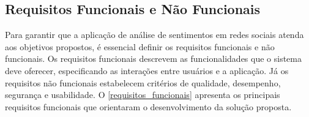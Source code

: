 \documentclass[
	12pt,				%
	oneside,			%
	a4paper,			%
	english,			%
	french,				%
	spanish,			%
	brazil				%
	]{abntex2}
\begin{document}
\hypertarget{requisitos-funcionais-e-nuxe3o-funcionais}{%
\subsection{Requisitos Funcionais e Não
Funcionais}\label{requisitos-funcionais-e-nuxe3o-funcionais}}

Para garantir que a aplicação de análise de sentimentos em redes sociais
atenda aos objetivos propostos, é essencial definir os requisitos
funcionais e não funcionais. Os requisitos funcionais descrevem as
funcionalidades que o sistema deve oferecer, especificando as interações
entre usuários e a aplicação. Já os requisitos não funcionais
estabelecem critérios de qualidade, desempenho, segurança e usabilidade.
O \autoref{requisitos_funcionais} apresenta os principais requisitos
funcionais que orientaram o desenvolvimento da solução proposta.
\end{document}
